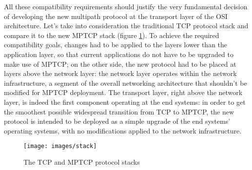 All these compatibility requirements should justify the very fundamental decision of developing the new multipath protocol at the transport layer of the OSI architecture. Let's take into consideration the traditional TCP protocol stack and compare it to the new MPTCP stack (figure \ref{fig:stack}).
To achieve the required compatibility goals, changes had to be applied to the layers lower than the application layer, so that current applications do not have to be upgraded to make use of MPTCP; on the other side, the new protocol had to be placed at layers above the network layer: the network layer operates within the network infrastructure, a segment of the overall networking architecture that shouldn't be modified for MPTCP deployment. The transport layer, right above the network layer, is indeed the first component operating at the end systems: in order to get the smoothest possible widespread transition from TCP to MPTCP, the new protocol is intended to be deployed as a simple upgrade of the end systems' operating systems, with no modifications applied to the network infrastructure.

\begin{figure}[!htb]
\centering
\texttt{[image: images/stack]}
\caption{The TCP and MPTCP protocol stacks}
\label{fig:stack}
\end{figure}

